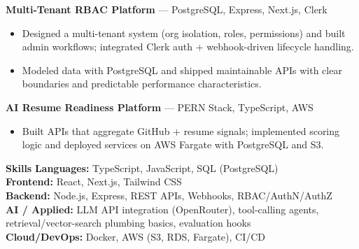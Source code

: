 \documentclass[10pt,a4paper]{article}
\begin{document}
\textbf{Multi-Tenant RBAC Platform} — PostgreSQL, Express, Next.js, Clerk\\
\begin{itemize}
  \item Designed a multi-tenant system (org isolation, roles, permissions) and built admin workflows; integrated Clerk auth + webhook-driven lifecycle handling.
  \item Modeled data with PostgreSQL and shipped maintainable APIs with clear boundaries and predictable performance characteristics.
\end{itemize}

\textbf{AI Resume Readiness Platform} — PERN Stack, TypeScript, AWS\\
\begin{itemize}
  \item Built APIs that aggregate GitHub + resume signals; implemented scoring logic and deployed services on AWS Fargate with PostgreSQL and S3.
\end{itemize}

\vspace{6pt}
{\large\bfseries Skills}
\vspace{2pt}
\textbf{Languages:} TypeScript, JavaScript, SQL (PostgreSQL)\\
\textbf{Frontend:} React, Next.js, Tailwind CSS\\
\textbf{Backend:} Node.js, Express, REST APIs, Webhooks, RBAC/AuthN/AuthZ\\
\textbf{AI / Applied:} LLM API integration (OpenRouter), tool-calling agents, retrieval/vector-search plumbing basics, evaluation hooks\\
\textbf{Cloud/DevOps:} Docker, AWS (S3, RDS, Fargate), CI/CD
\end{document}
